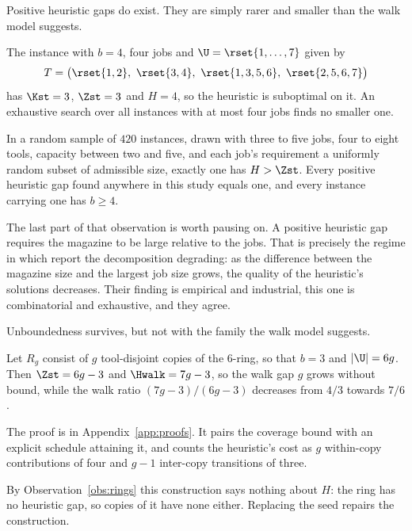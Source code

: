 Positive heuristic gaps do exist. They are simply rarer and smaller than the walk
model suggests.

\begin{observation}\label{obs:smallest}
The instance with $b=4$, four jobs and $\U=\rset{1,\dots,7}$ given by
\[
  T=\bigl(\rset{1,2},\ \rset{3,4},\ \rset{1,3,5,6},\ \rset{2,5,6,7}\bigr)
\]
has $\Kst=3$, $\Zst=3$ and $H=4$, so the heuristic is suboptimal on it. An exhaustive
search over all instances with at most four jobs finds no smaller one.
\end{observation}

\begin{observation}\label{obs:census}
In a random sample of $420$ instances, drawn with three to five jobs, four to eight
tools, capacity between two and five, and each job's requirement a uniformly random
subset of admissible size, exactly one has $H>\Zst$. Every positive heuristic gap
found anywhere in this study equals one, and every instance carrying one has
$b\ge4$.
\end{observation}

The last part of that observation is worth pausing on. A positive heuristic gap
requires the magazine to be large relative to the jobs. That is precisely the regime
in which \citet{Burger2015} report the decomposition degrading: as the difference
between the magazine size and the largest job size grows, the quality of the
heuristic's solutions decreases. Their finding is empirical and industrial, this one
is combinatorial and exhaustive, and they agree.

Unboundedness survives, but not with the family the walk model suggests.

\begin{proposition}\label{prop:unbounded}
Let $R_g$ consist of $g$ tool-disjoint copies of the $6$-ring, so that $b=3$ and
$\lvert\U\rvert=6g$. Then $\Zst=6g-3$ and $\Hwalk=7g-3$, so the walk gap $g$ grows
without bound, while the walk ratio $(7g-3)/(6g-3)$ decreases from $4/3$ towards
$7/6$.
\end{proposition}

The proof is in Appendix~\ref{app:proofs}. It pairs the coverage bound with an
explicit schedule attaining it, and counts the heuristic's cost as $g$ within-copy
contributions of four and $g-1$ inter-copy transitions of three.

By Observation~\ref{obs:rings} this construction says nothing about $H$: the ring has
no heuristic gap, so copies of it have none either. Replacing the seed repairs the
construction.

